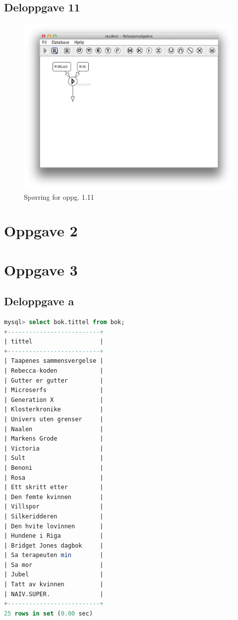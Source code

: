 \documentclass[a4paper, 12pt] {article}
\begin{document}
\subsection{Deloppgave 11}
\begin{figure}[h!]
    \includegraphics[width=\linewidth]{img/1-11.png}
    \caption{Spørring for oppg. 1.11 \label{img:1.11}}
\end{figure}
\newpage

\section{Oppgave 2}



\section{Oppgave 3}

\subsection{Deloppgave a}

\begin{lstlisting}[language=SQL, label=oppg3a, caption=Oppgave 3a]
mysql> select bok.tittel from bok;
+--------------------------+
| tittel                   |
+--------------------------+
| Taapenes sammensvergelse |
| Rebecca-koden            |
| Gutter er gutter         |
| Microserfs               |
| Generation X             |
| Klosterkronike           |
| Univers uten grenser     |
| Naalen                   |
| Markens Grode            |
| Victoria                 |
| Sult                     |
| Benoni                   |
| Rosa                     |
| Ett skritt etter         |
| Den femte kvinnen        |
| Villspor                 |
| Silkeridderen            |
| Den hvite lovinnen       |
| Hundene i Riga           |
| Bridget Jones dagbok     |
| Sa terapeuten min        |
| Sa mor                   |
| Jubel                    |
| Tatt av kvinnen          |
| NAIV.SUPER.              |
+--------------------------+
25 rows in set (0.00 sec)
\end{lstlisting}
\end{document}
